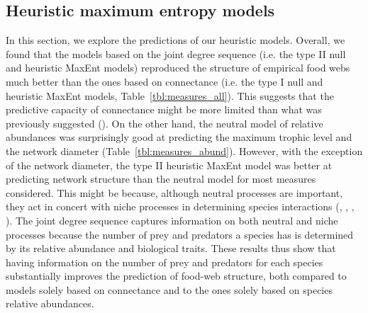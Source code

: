 \subsection{Heuristic maximum entropy models}

In this section, we explore the predictions of our heuristic models. Overall, we
found that the models based on the joint degree sequence (i.e. the type II null
and heuristic MaxEnt models) reproduced the structure of empirical food webs
much better than the ones based on connectance (i.e. the type I null and
heuristic MaxEnt models, Table~\ref{tbl:measures_all}). This suggests that the
predictive capacity of connectance might be more limited than what was
previously suggested (\cite{Poisot2014When}). On the other hand, the neutral
model of relative abundances was surprisingly good at predicting the maximum
trophic level and the network diameter (Table~\ref{tbl:measures_abund}). However,
with the exception of the network diameter, the type II heuristic MaxEnt model
was better at predicting network structure than the neutral model for most
measures considered. This might be because, although neutral processes are
important, they act in concert with niche processes in determining species
interactions (\cite{Bartomeus2016Common}, \cite{Canard2014Empirical},
\cite{Poisot2015Species}, \cite{Pomeranz2019Inferring}). The joint degree sequence
captures information on both neutral and niche processes because the number of
prey and predators a species has is determined by its relative abundance and
biological traits. These results thus show that having information on the number
of prey and predators for each species substantially improves the prediction of
food-web structure, both compared to models solely based on connectance and to
the ones solely based on species relative abundances.


